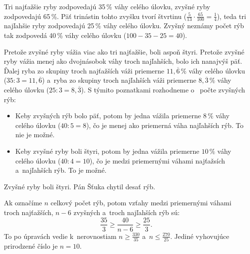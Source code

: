 {%
Tri najťažšie ryby zodpovedajú 35\,\% váhy celého úlovku, zvyšné ryby zodpovedajú 65\,\%.
Päť trinástin tohto zvyšku tvorí štvrtinu ($\frac5{13}\cdot\frac{65}{100} =\frac14$), teda tri najľahšie ryby zodpovedajú 25\,\% váhy celého úlovku.
Zvyšný neznámy počet rýb tak zodpovedá 40\,\% váhy celého úlovku ($100-35-25=40$).

Pretože zvyšné ryby vážia viac ako tri najťažšie, boli aspoň štyri.
Pretože zvyšné ryby vážia menej ako dvojnásobok váhy troch najľahších, bolo ich nanajvýš päť.
Ďalej ryba zo skupiny troch najťažších váži priemerne $11{,}\overline{6}\,\%$ váhy celého úlovku ($35:3=11{,}\overline{6}$) a~ryba zo skupiny troch najľahších váži priemerne $8{,}\overline{3}\,\%$ váhy celého úlovku ($25:3=8{,}\overline{3}$).
S týmito poznatkami rozhodneme o ~počte zvyšných rýb:
\begin{itemize}
  \item Keby zvyšných rýb bolo päť, potom by jedna vážila priemerne $8\,\%$ váhy celého úlovku ($40:5=8$), čo je menej ako priemerná váha najľahších rýb.
  To nie je možné.
  \item Keby zvyšné ryby boli štyri, potom by jedna vážila priemerne $10\,\%$ váhy celého úlovku ($40:4=10$), čo je medzi priemernými váhami najťažsích a~najľahších rýb.
  To je možné.
\end{itemize}

Zvyšné ryby boli štyri.
Pán Šťuka chytil desať rýb.

\poznamka
Ak označíme $n$ celkový počet rýb, potom vzťahy medzi priemernými váhami troch najťažších, $n-6$ zvyšných a~troch najľahších rýb sú:
$$
\frac{35}{3} \ge \frac{40}{n-6} \ge \frac{25}{3} .
$$
To po úpravách vedie k~nerovnostiam $n \ge \frac{330}{35}$ a~$n \le \frac{270}{25}$.
Jediné vyhovujúce prirodzené číslo je $n=10$.
}

